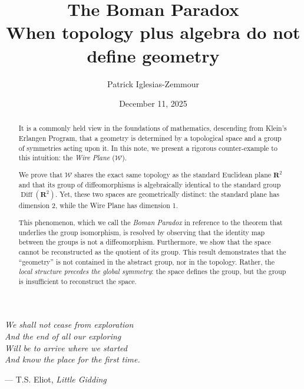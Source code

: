 \documentclass[10pt,letterpaper,reqno]{amsart}
\title[The Boman Paradox]{\textbf{The Boman Paradox}\\ \small When topology plus algebra do not define geometry}
\author{Patrick Iglesias-Zemmour}
\date{December 11, 2025}
\newcommand{\RR}{\mathbf{R}}
\newcommand{\cW}{\mathcal{W}}
\DeclareMathOperator{\Diff}{Diff}
\begin{document}
  
  
  \maketitle
  
  
  \thispagestyle{empty}
  \vspace{0.5cm}
  \begin{flushright}
    \begin{minipage}{0.6\textwidth}
      \itshape\small
      \raggedleft
      We shall not cease from exploration\\
      And the end of all our exploring\\
      Will be to arrive where we started\\
      And know the place for the first time.
      \par\vspace{1ex}
      \upshape --- T.S. Eliot, \textit{Little Gidding}
    \end{minipage}
  \end{flushright}
  \vspace{1cm}
  
  
  \begin{abstract}
    \noindent It is a commonly held view in the foundations of mathematics,
    descending from Klein's Erlangen Program,
    that a geometry is determined by a topological space and a group of symmetries acting upon it.
    In this note,
    we present a rigorous counter-example to this intuition:
    the \emph{Wire Plane} ($\cW$).
    
    \noindent We prove that $\cW$ shares the exact same topology as the standard Euclidean plane $\RR^2$ and that its group of diffeomorphisms is algebraically identical to the standard group $\Diff(\RR^2)$.
    Yet,
    these two spaces are geometrically distinct:
    the standard plane has dimension 2,
    while the Wire Plane has dimension 1.
    
    \noindent This phenomenon,
    which we call the \emph{Boman Paradox} in reference to the theorem that underlies the group isomorphism,
    is resolved by observing that the identity map between the groups is not a diffeomorphism.
    Furthermore,
    we show that the space cannot be reconstructed as the quotient of its group.
    This result demonstrates that the ``geometry'' is not contained in the abstract group,
    nor in the topology.
    Rather,
    the \emph{local structure precedes the global symmetry}:
    the space defines the group,
    but the group is insufficient to reconstruct the space.
  \end{abstract}
  
\end{document}
